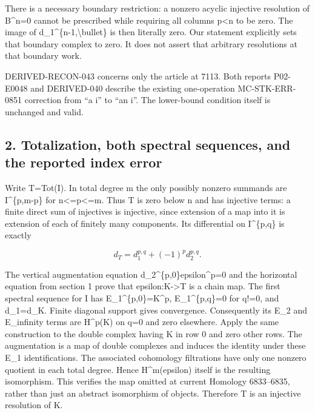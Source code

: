 There is a necessary boundary restriction:\allowbreak{} a nonzero acyclic injective resolution of B\textasciicircum{}n\allowbreak{}=0 cannot be prescribed while requiring all columns p\textless n to be zero. The image of d\_\allowbreak{}1\textasciicircum{}\{n-1,\allowbreak{}\textbackslash{}bullet\} is then literally zero. Our statement explicitly sets that boundary complex to zero. It does not assert that arbitrary resolutions at that boundary work.

DERIVED-RECON-043 concerns only the article at 7113. Both reports P02-E0048 and DERIVED-040 describe the existing one-operation MC-STK-ERR-0851 correction from ``a i'' to ``an i''. The lower-bound condition itself is unchanged and valid.

\subsection{\texorpdfstring{2. Totalization,\allowbreak{} both spectral sequences,\allowbreak{} and the reported index error}{2.  both spectral  and the reported index error}}\label{proofs-7096-7578-totalization-both-spectral-sequences-and-the-reported-index-error}

Write T\allowbreak{}=Tot(I)\allowbreak{}. In total degree m the only possibly nonzero summands are I\textasciicircum{}\{p,\allowbreak{}m-p\} for n<\allowbreak{}=p<\allowbreak{}=m. Thus T is zero below n and has injective terms:\allowbreak{} a finite direct sum of injectives is injective,\allowbreak{} since extension of a map into it is extension of each of finitely many components. Its differential on I\textasciicircum{}\{p,\allowbreak{}q\} is exactly

\[
 d_T=d_1^{p,q}+(-1)^p d_2^{p,q}.                               \tag{2.1}
\]

The vertical augmentation equation d\_\allowbreak{}2\textasciicircum{}\{p,\allowbreak{}0\}epsilon\textasciicircum{}p\allowbreak{}=0 and the horizontal equation from section 1 prove that epsilon:\allowbreak{}K\allowbreak{}->T is a chain map. The first spectral sequence for I has E\_\allowbreak{}1\textasciicircum{}\{p,\allowbreak{}0\}\allowbreak{}=K\textasciicircum{}p,\allowbreak{} E\_\allowbreak{}1\textasciicircum{}\{p,\allowbreak{}q\}\allowbreak{}=0 for q!\allowbreak{}=0,\allowbreak{} and d\_\allowbreak{}1\allowbreak{}=d\_\allowbreak{}K. Finite diagonal support gives convergence. Consequently its E\_\allowbreak{}2 and E\_\allowbreak{}infinity terms are H\textasciicircum{}p(K)\allowbreak{} on q\allowbreak{}=0 and zero elsewhere. Apply the same construction to the double complex having K in row 0 and zero other rows. The augmentation is a map of double complexes and induces the identity under these E\_\allowbreak{}1 identifications. The associated cohomology filtrations have only one nonzero quotient in each total degree. Hence H\textasciicircum{}m(epsilon)\allowbreak{} itself is the resulting isomorphism. This verifies the map omitted at current Homology 6833–\allowbreak{}6835,\allowbreak{} rather than just an abstract isomorphism of objects. Therefore T is an injective resolution of K.

